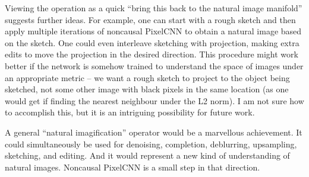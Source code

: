\documentclass[11pt, a4paper, openany]{book}
\newcommand{\nquote}[1]{``{#1}''}
\begin{document}
Viewing the operation as a quick \nquote{bring this back to the natural image manifold} suggests further ideas. For example, one can start with a rough sketch and then apply multiple iterations of noncausal PixelCNN to obtain a natural image based on the sketch. One could even interleave sketching with projection, making extra edits to move the projection in the desired direction. This procedure might work better if the network is somehow trained to understand the space of images under an appropriate metric -- we want a rough sketch to project to the object being sketched, not some other image with black pixels in the same location (as one would get if finding the nearest neighbour under the L2 norm). I am not sure how to accomplish this, but it is an intriguing possibility for future work.

A general \nquote{natural imagification} operator would be a marvellous achievement. It could simultaneously be used for denoising, completion, deblurring, upsampling, sketching, and editing. And it would represent a new kind of understanding of natural images. Noncausal PixelCNN is a small step in that direction.


\backmatter




\printindex
\end{document}
